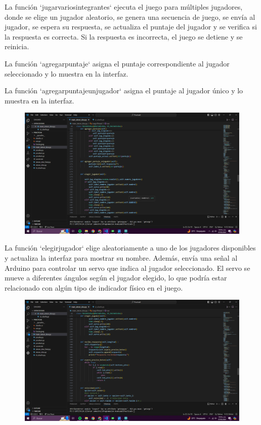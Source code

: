\documentclass{article}
\begin{document}
{{\begin{figure}[h]
\end{figure}

{\Large La función `jugarvariosintegrantes` ejecuta el juego para múltiples jugadores, donde se elige un jugador aleatorio, se genera una secuencia de juego, se envía al jugador, se espera su respuesta, se actualiza el puntaje del jugador y se verifica si la respuesta es correcta. Si la respuesta es incorrecta, el juego se detiene y se reinicia.

La función `agregarpuntaje` asigna el puntaje correspondiente al jugador seleccionado y lo muestra en la interfaz.

La función `agregarpuntajeunjugador` asigna el puntaje al jugador único y lo muestra en la interfaz.

}


\newpage
\begin{figure}[h]
    \centering
    \includegraphics[width=1\textwidth]{Captura de pantalla (772).png}
    
\end{figure}

{\Large La función `elegirjugador` elige aleatoriamente a uno de los jugadores disponibles y actualiza la interfaz para mostrar su nombre. Además, envía una señal al Arduino para controlar un servo que indica al jugador seleccionado. El servo se mueve a diferentes ángulos según el jugador elegido, lo que podría estar relacionado con algún tipo de indicador físico en el juego.

}

\newpage
\begin{figure}[h]
    \centering
    \includegraphics[width=1\textwidth]{Captura de pantalla (773).png}
    

\end{figure}}}
\end{document}
